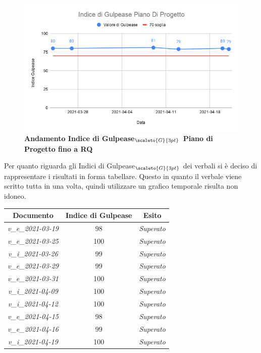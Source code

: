 {{{{{{{{{{{{\begin{figure}[H]
	\begin{center}
		\includegraphics[width=0.8\linewidth]{../immagini/gulpeaseRQ/Indice_di_Gulpease_Piano_Di_Progetto.png}
		\caption{\textbf{Andamento Indice di Gulpease$_{\scaleto{G}{3pt}}$ Piano di Progetto fino a RQ}}
	\end{center}
\end{figure}

Per quanto riguarda gli Indici di Gulpease$_{\scaleto{G}{3pt}}$ dei verbali si è deciso di rappresentare i risultati in forma tabellare.
Questo in quanto il verbale viene scritto tutta in una volta, quindi utilizzare un grafico temporale risulta non idoneo.

\quad
\def\tabularxcolumn#1{m{#1}}
{
	\begin{center}
		\renewcommand{\arraystretch}{1.4}
		\begin{tabularx}{9.5cm}{|c|c|c|}
			\hline
			\rowcolor{airforceblue}
			\textbf{Documento} & \textbf{Indice di Gulpease} & \textbf{Esito}\\
			\hline
			\textit{v\_e\_2021-03-19} & 98 & \textit{Superato}\\
			\textit{v\_e\_2021-03-25} & 100 & \textit{Superato}\\
			\textit{v\_i\_2021-03-26} & 99 & \textit{Superato}\\
			\textit{v\_e\_2021-03-29} & 99 & \textit{Superato}\\
			\textit{v\_e\_2021-03-31} & 100 & \textit{Superato}\\
			\textit{v\_i\_2021-04-09} & 100 & \textit{Superato}\\
			\textit{v\_i\_2021-04-12} & 100 & \textit{Superato}\\
			\textit{v\_e\_2021-04-15} & 98 & \textit{Superato}\\
			\textit{v\_e\_2021-04-16} & 99 & \textit{Superato}\\
			\textit{v\_i\_2021-04-19} & 100 & \textit{Superato}\\
			\hline
		\end{tabularx}
	\end{center}




}}}}}}}}}}}}}
